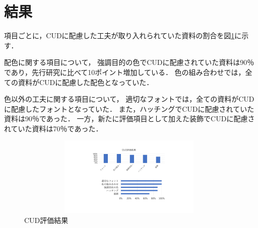 \section{結果}
項目ごとに，CUDに配慮した工夫が取り入れられていた資料の割合を図\ref{fig:result}に示す．

配色に関する項目について，
強調目的の色でCUDに配慮されていた資料は90％であり，先行研究に比べて10ポイント増加している．
色の組み合わせでは，全ての資料がCUDに配慮した配色となっていた．

色以外の工夫に関する項目について，
適切なフォントでは，全ての資料がCUDに配慮したフォントとなっていた．
また，ハッチングでCUDに配慮されていた資料は90％であった．
一方，新たに評価項目として加えた装飾でCUDに配慮されていた資料は70％であった．

\begin{figure}[h]
\begin{center}
 \includegraphics[clip,width=110mm,height=38mm]{images/result.pdf}
\end{center}
 \caption{CUD評価結果}
 \label{fig:result}
\end{figure}
